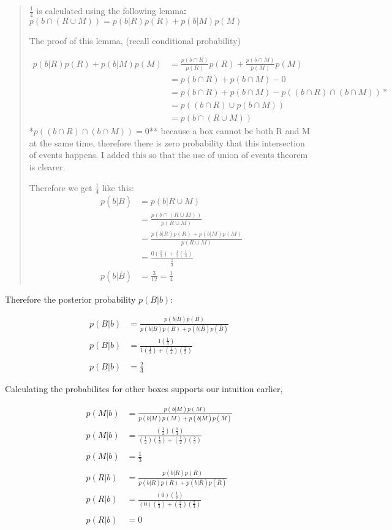 \begin{quote}
\textbf{\(\frac{1}{4}\)} is calculated using the following
lemma\textbf{: }\(p(b \cap (R \cup M))= p(b|R)p(R)+p(b|M)p(M)\)

The proof of this lemma, (recall conditional probability)

\[
\begin{aligned}
p(b|R)p(R)+p(b|M)p(M)&=\frac{p(b \cap R)}{p(R)}p(R)+\frac{p(b \cap M)}{p(M)}p(M)\\
&=p(b \cap R)+p(b \cap M) - 0\\
&=p(b \cap R)+p(b \cap M) - p((b \cap R) \cap (b \cap M))*\\
&=p((b \cap R) \cup p(b \cap M))\\
&=p(b \cap (R \cup  M))
\end{aligned}
\] *\(p((b \cap R) \cap (b \cap M))=0\)** because a box cannot be both R
and M at the same time, therefore there is zero probability that this
intersection of events happens. I added this so that the use of union of
events theorem is clearer.

Therefore we get \textbf{\(\frac{1}{4}\)} like this: \[
\begin{aligned}
p(b|\overline{B})&=p(b|R \cup M)\\&=\frac{p(b \cap (R \cup M))}{p(R \cup M)}\\&=\frac{p(b|R)p(R)+p(b|M)p(M)}{p(R \cup M)}\\
&=\frac{0(\frac{1}{3})+\frac{1}{2}(\frac{1}{3})}{\frac{2}{3}}\\
p(b|\overline{B})&=\frac{3}{12}=\frac{1}{4}
\end{aligned}
\]
\end{quote}

Therefore the posterior probability \textbf{\(p(B|b)\)}:

\[
\begin{aligned}
p(B|b)&=\frac{p(b|B)p(B)}{p(b|B)p(B)+p(b|\overline{B})p(\overline{B})}\\
p(B|b)&=\frac{1(\frac{1}{3})}{1(\frac{1}{3})+(\frac{1}{4})(\frac{2}{3})}\\\\
p(B|b)&=\frac{2}{3}
\end{aligned}
\]

Calculating the probabilites for other boxes supports our intuition
earlier,

\[
\begin{aligned}
p(M|b)&=\frac{p(b|M)p(M)}{p(b|M)p(M)+p(b|\overline{M})p(\overline{M})}\\
p(M|b)&=\frac{(\frac{1}{2})(\frac{1}{3})}{(\frac{1}{2})(\frac{1}{3})+(\frac{1}{2})(\frac{2}{3})}\\\\
p(M|b)&=\frac{1}{3}\\\\
p(R|b)&=\frac{p(b|R)p(R)}{p(b|R)p(R)+p(b|\overline{R})p(\overline{R})}\\
p(R|b)&=\frac{(0)(\frac{1}{3})}{(0)(\frac{1}{3})+(\frac{3}{4})(\frac{2}{3})}\\\\
p(R|b)&=0
\end{aligned}
\]

